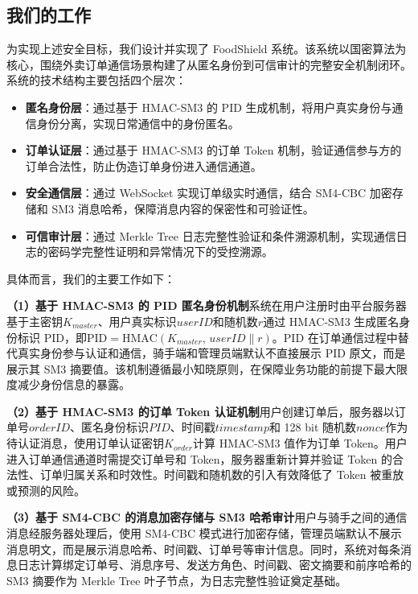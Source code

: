 \subsection{我们的工作}

为实现上述安全目标，我们设计并实现了 FoodShield 系统。该系统以国密算法为核心，围绕外卖订单通信场景构建了从匿名身份到可信审计的完整安全机制闭环。系统的技术结构主要包括四个层次：

\begin{itemize}[leftmargin=2em]
\item \textbf{匿名身份层}：通过基于 HMAC-SM3 的 PID 生成机制，将用户真实身份与通信身份分离，实现日常通信中的身份匿名。
\item \textbf{订单认证层}：通过基于 HMAC-SM3 的订单 Token 机制，验证通信参与方的订单合法性，防止伪造订单身份进入通信通道。
\item \textbf{安全通信层}：通过 WebSocket 实现订单级实时通信，结合 SM4-CBC 加密存储和 SM3 消息哈希，保障消息内容的保密性和可验证性。
\item \textbf{可信审计层}：通过 Merkle Tree 日志完整性验证和条件溯源机制，实现通信日志的密码学完整性证明和异常情况下的受控溯源。
\end{itemize}

具体而言，我们的主要工作如下：

\textbf{（1）基于 HMAC-SM3 的 PID 匿名身份机制}\quad 系统在用户注册时由平台服务器基于主密钥$K_{master}$、用户真实标识$userID$和随机数$r$通过 HMAC-SM3 生成匿名身份标识 PID，即$\mathrm{PID} = \mathrm{HMAC}(K_{master},\, userID \parallel r)$。PID 在订单通信过程中替代真实身份参与认证和通信，骑手端和管理员端默认不直接展示 PID 原文，而是展示其 SM3 摘要值。该机制遵循最小知晓原则，在保障业务功能的前提下最大限度减少身份信息的暴露。

\textbf{（2）基于 HMAC-SM3 的订单 Token 认证机制}\quad 用户创建订单后，服务器以订单号$orderID$、匿名身份标识$PID$、时间戳$timestamp$和 128 bit 随机数$nonce$作为待认证消息，使用订单认证密钥$K_{order}$计算 HMAC-SM3 值作为订单 Token。用户进入订单通信通道时需提交订单号和 Token，服务器重新计算并验证 Token 的合法性、订单归属关系和时效性。时间戳和随机数的引入有效降低了 Token 被重放或预测的风险。

\textbf{（3）基于 SM4-CBC 的消息加密存储与 SM3 哈希审计}\quad 用户与骑手之间的通信消息经服务器处理后，使用 SM4-CBC 模式进行加密存储，管理员端默认不展示消息明文，而是展示消息哈希、时间戳、订单号等审计信息。同时，系统对每条消息日志计算绑定订单号、消息序号、发送方角色、时间戳、密文摘要和前序哈希的 SM3 摘要作为 Merkle Tree 叶子节点，为日志完整性验证奠定基础。

